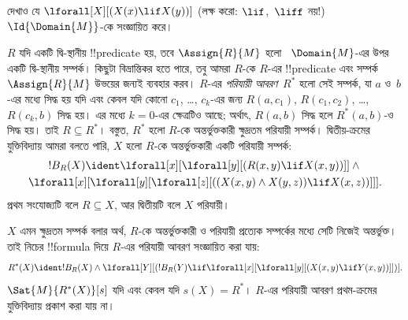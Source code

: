 \documentclass[../../../include/open-logic-section]{subfiles}
\begin{document}
\begin{prob}
দেখাও যে $\lforall[X][(X(x) \lif X(y))]$ (লক্ষ করো:
$\lif$,~$\liff$ নয়!)~$\Id{\Domain{M}}$-কে সংজ্ঞায়িত করে।
\end{prob}

\begin{ex}
$R$ যদি একটি দ্বি-স্থানীয় !!{predicate} হয়, তবে $\Assign{R}{M}$ হলো
~$\Domain{M}$-এর উপর একটি দ্বি-স্থানীয় সম্পর্ক। কিছুটা বিভ্রান্তিকর
হতে পারে, তবু আমরা $R$-কে $R$-এর !!{predicate} এবং সম্পর্ক
~$\Assign{R}{M}$ উভয়ের জন্যই ব্যবহার করব। $R$-এর \emph{পরিযায়ী
আবরণ}~$R^*$ হলো সেই সম্পর্ক, যা $a$ ও~$b$-এর মধ্যে সিদ্ধ হয় যদি এবং
কেবল যদি কোনো $c_1$, \dots, $c_k$-এর জন্য $R(a,c_1)$, $R(c_1, c_2)$,
\dots, $R(c_k,b)$ সিদ্ধ হয়। এর মধ্যে $k = 0$-এর ক্ষেত্রটিও আছে;
অর্থাৎ, $R(a,b)$ সিদ্ধ হলে $R^*(a,b)$-ও সিদ্ধ হয়। তাই $R \subseteq
R^*$। বস্তুত, $R^*$ হলো $R$-কে অন্তর্ভুক্তকারী ক্ষুদ্রতম পরিযায়ী
সম্পর্ক। দ্বিতীয়-ক্রমের যুক্তিবিদ্যায় আমরা বলতে পারি, $X$ হলো
$R$-কে অন্তর্ভুক্তকারী একটি পরিযায়ী সম্পর্ক:
\begin{multline*}
  !B_R(X) \ident \lforall[x][\lforall[y][(R(x,y) \lif X(x, y))]] \land {}\\
\lforall[x][\lforall[y][\lforall[z][((X(x,y) \land X(y,z)) \lif X(x,
      z))]]].
\end{multline*}
প্রথম সংযোজ্যটি বলে $R \subseteq X$, আর দ্বিতীয়টি বলে $X$ পরিযায়ী।

$X$ এমন ক্ষুদ্রতম সম্পর্ক বলার অর্থ, $R$-কে অন্তর্ভুক্তকারী ও পরিযায়ী
প্রত্যেক সম্পর্কের মধ্যে সেটি নিজেই অন্তর্ভুক্ত। তাই নিচের !!{formula}
দিয়ে $R$-এর পরিযায়ী আবরণ সংজ্ঞায়িত করা যায়:
\[
R^*(X) \ident !B_R(X) \land \lforall[Y][(!B_R(Y) \lif
  \lforall[x][\lforall[y][(X(x, y) \lif Y(x,y))]])].
\]
$\Sat{M}{R^*(X)}[s]$ যদি এবং কেবল যদি $s(X) = R^*$। $R$-এর পরিযায়ী
আবরণ প্রথম-ক্রমের যুক্তিবিদ্যায় প্রকাশ করা যায় না।
\end{ex}
\end{document}
